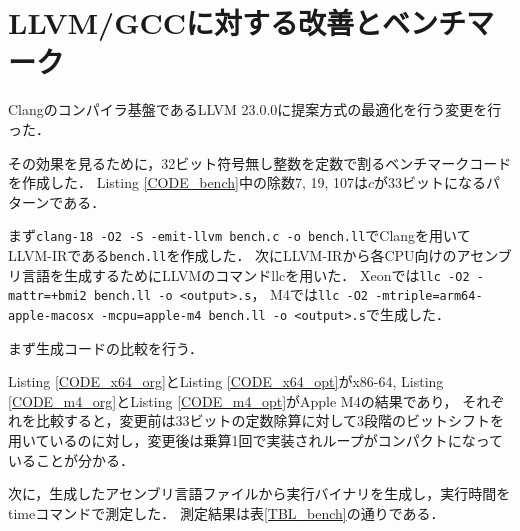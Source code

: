 \documentclass{jarticle}
\begin{document}




\section{LLVM/GCCに対する改善とベンチマーク}
Clangのコンパイラ基盤であるLLVM 23.0.0に提案方式の最適化を行う変更を行った\cite{LLVMopt}．

その効果を見るために，32ビット符号無し整数を定数で割るベンチマークコードを作成した．
Listing \ref{CODE_bench}中の除数7, 19, 107は$c$が33ビットになるパターンである．



まず\texttt{clang-18 -O2 -S -emit-llvm bench.c -o bench.ll}でClangを用いてLLVM-IRである\texttt{bench.ll}を作成した．
次にLLVM-IRから各CPU向けのアセンブリ言語を生成するためにLLVMのコマンドllcを用いた．
Xeonでは\texttt{llc -O2 -mattr=+bmi2 bench.ll -o <output>.s}，
M4では\texttt{llc -O2 -mtriple=arm64-apple-macosx -mcpu=apple-m4 bench.ll -o <output>.s}で生成した．

まず生成コードの比較を行う．





Listing \ref{CODE_x64_org}とListing \ref{CODE_x64_opt}がx86-64, Listing \ref{CODE_m4_org}とListing \ref{CODE_m4_opt}がApple M4の結果であり，
それぞれを比較すると，変更前は33ビットの定数除算に対して3段階のビットシフトを用いているのに対し，変更後は乗算1回で実装されループがコンパクトになっていることが分かる．

次に，生成したアセンブリ言語ファイルから実行バイナリを生成し，実行時間をtimeコマンドで測定した．
測定結果は表\ref{TBL_bench}の通りである．
\end{document}
